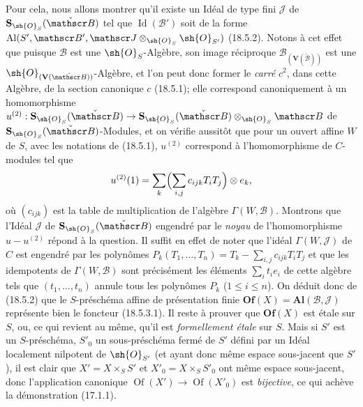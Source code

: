 Pour cela, nous allons montrer qu'il existe un Idéal de type fini $\mathscr J$ de $\mathbf S_{\sh{O}_S}(\check{\mathscr B})$ tel que $\operatorname{Id}(\mathscr B')$ soit de la forme $\operatorname{Al}(S',\mathscr B',\mathscr J\otimes_{\sh{O}_S}\sh{O}_{S'})$ (18.5.2). Notons à cet effet que puisque $\mathscr B$ est une $\sh{O}_S$-Algèbre, son image réciproque $\mathscr B_{(\mathbf V(\check{\mathscr B}))}$ est une $\sh{O}_{(\mathbf V(\check{\mathscr B}))}$-Algèbre, et l'on peut donc former le \emph{carré} $c^2$, dans cette Algèbre, de la section canonique $c$ (18.5.1); elle correspond canoniquement à un homomorphisme $u^{(2)}:\mathbf S_{\sh{O}_S}(\check{\mathscr B})\to\mathbf S_{\sh{O}_S}(\check{\mathscr B})\otimes_{\sh{O}_S}\mathscr B$ de $\mathbf S_{\sh{O}_S}(\check{\mathscr B})$-Modules, et on vérifie aussitôt que pour un ouvert affine $W$ de $S$, avec les notations de (18.5.1), $u^{(2)}$ correspond à l'homomorphisme de $C$-modules tel que
\[
  u^{(2)}(1)=\sum_k\Bigl(\sum_{i,j}c_{ijk}T_iT_j\Bigr)\otimes e_k,
\]
où $(c_{ijk})$ est la table de multiplication de l'algèbre $\Gamma(W,\mathscr B)$. Montrons que l'Idéal $\mathscr J$ de $\mathbf S_{\sh{O}_S}(\check{\mathscr B})$ engendré par le \emph{noyau} de l'homomorphisme $u-u^{(2)}$ répond à la question. Il suffit en effet de noter que l'idéal $\Gamma(W,\mathscr J)$ de $C$ est engendré par les polynômes $P_k(T_1,\ldots,T_n)=T_k-\sum_{i,j}c_{ijk}T_iT_j$ et que les idempotents de $\Gamma(W,\mathscr B)$ sont précisément les éléments $\sum_i t_i e_i$ de cette algèbre tels que $(t_1,\ldots,t_n)$ annule tous les polynômes $P_k$ ($1\leq i\leq n$). On déduit donc de (18.5.2) que le $S$-préschéma affine de présentation finie $\mathbf{Of}(X)=\mathbf{Al}(\mathscr B,\mathscr J)$ représente bien le foncteur (18.5.3.1). Il reste à prouver que $\mathbf{Of}(X)$ est étale sur $S$, ou, ce qui revient au même, qu'il est \emph{formellement étale} sur $S$. Mais si $S'$ est un $S$-préschéma, $S'_0$ un sous-préschéma fermé de $S'$ défini par un Idéal localement nilpotent de $\sh{O}_{S'}$ (et ayant donc même espace sous-jacent que $S'$), il est clair que $X'=X\times_S S'$ et $X'_0=X\times_S S'_0$ ont même espace sous-jacent, donc l'application canonique $\operatorname{Of}(X')\to\operatorname{Of}(X'_0)$ est \emph{bijective}, ce qui achève la démonstration (17.1.1).

